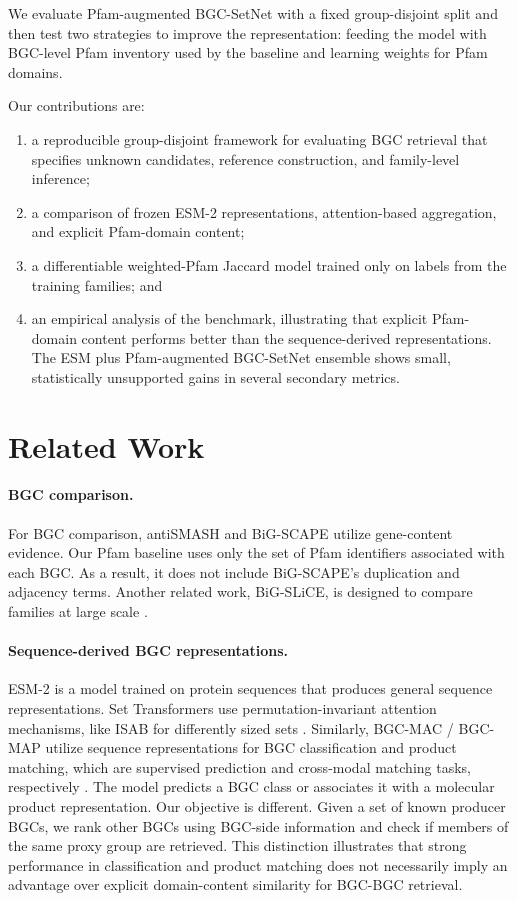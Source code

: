 \documentclass{article}
\begin{document}
We evaluate Pfam-augmented BGC-SetNet with a fixed group-disjoint split and then test two strategies to improve the representation: feeding the model with BGC-level Pfam inventory used by the baseline and learning weights for Pfam domains.


Our contributions are:
\begin{enumerate}
    \item a reproducible group-disjoint framework for evaluating BGC retrieval that specifies unknown candidates, reference construction, and family-level inference;
    \item a comparison of frozen ESM-2 representations, attention-based aggregation, and explicit Pfam-domain content;
    \item a differentiable weighted-Pfam Jaccard model trained only on labels from the training families; and
    \item an empirical analysis of the benchmark, illustrating that explicit Pfam-domain content performs better than the sequence-derived representations. The ESM plus Pfam-augmented BGC-SetNet ensemble shows small, statistically unsupported gains in several secondary metrics.
\end{enumerate}

\section{Related Work}

\paragraph{BGC comparison.}
For BGC comparison, antiSMASH and BiG-SCAPE utilize gene-content evidence. Our Pfam baseline uses only the set of Pfam identifiers associated with each BGC. As a result, it does not include BiG-SCAPE's duplication and adjacency terms. Another related work, BiG-SLiCE, is designed to compare families at large scale \cite{kautsar2021}.

\paragraph{Sequence-derived BGC representations.}
ESM-2 is a model trained on protein sequences that produces general sequence representations. Set Transformers use permutation-invariant attention mechanisms, like ISAB for differently sized sets \cite{lee2019}. Similarly, BGC-MAC / BGC-MAP utilize sequence representations for BGC classification and product matching, which are supervised prediction and cross-modal matching tasks, respectively \cite{lu2026}. The model predicts a BGC class or associates it with a molecular product representation. Our objective is different. Given a set of known producer BGCs, we rank other BGCs using BGC-side information and check if members of the same proxy group are retrieved. This distinction illustrates that strong performance in classification and product matching does not necessarily imply an advantage over explicit domain-content similarity for BGC-BGC retrieval.
\end{document}
